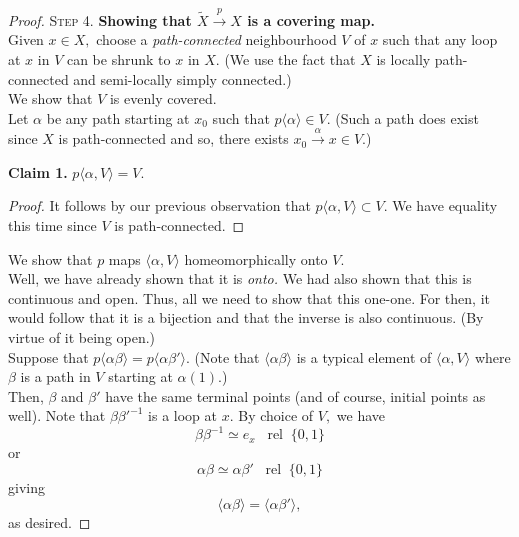 \documentclass[12pt]{article}
\theoremstyle{definition}
\numberwithin{thm}{section}
\newcommand{\rel}{\;\;\operatorname{rel}\;}
\newenvironment{blockquote}
{\begin{mdframed}[skipabove=0pt, skipbelow=0pt, innertopmargin=4pt, innerbottommargin=4pt, bottomline=false,topline=false,rightline=false, linewidth=2pt]}
{\end{mdframed}}
\begin{document}
\begin{proof}
\textsc{Step 4.} \textbf{Showing that $\tilde{X} \overset{p}{\longrightarrow} X$ is a covering map.}\\
Given $x \in X,$ choose a \emph{path-connected} neighbourhood $V$ of $x$ such that any loop at $x$ in $V$ can be shrunk to $x$ in $X.$ (We use the fact that $X$ is locally path-connected and semi-locally simply connected.) \\
We show that $V$ is evenly covered. \\
Let $\alpha$ be any path starting at $x_0$ such that $p\langle \alpha\rangle \in V.$ (Such a path does exist since $X$ is path-connected and so, there exists $x_0\overset{\alpha}{\longrightarrow} x \in V.$) \\
\begin{blockquote}
	\textbf{Claim 1.} $p\langle \alpha, V\rangle = V.$
	\begin{proof} 
		It follows by our previous observation that $p\langle \alpha, V\rangle \subset V.$ We have equality this time since $V$ is path-connected.
	\end{proof}
\end{blockquote}
We show that $p$ maps $\langle \alpha, V\rangle$ homeomorphically onto $V.$\\
Well, we have already shown that it is \emph{onto.} We had also shown that this is continuous and open. Thus, all we need to show that this one-one. For then, it would follow that it is a bijection and that the inverse is also continuous. (By virtue of it being open.)\\
Suppose that $p\langle \alpha\beta\rangle = p\langle \alpha\beta'\rangle.$ (Note that $\langle \alpha\beta\rangle$ is a typical element of $\langle \alpha, V\rangle$ where $\beta$ is a path in $V$ starting at $\alpha(1)$.)\\
Then, $\beta$ and $\beta'$ have the same terminal points (and of course, initial points as well). Note that $\beta\beta'^{-1}$ is a loop at $x.$ By choice of $V,$ we have
\begin{equation*} 
	\beta\beta^{-1} \simeq e_x \rel\{0, 1\}
\end{equation*}
or
\begin{equation*} 
	\alpha\beta \simeq \alpha\beta' \rel\{0, 1\}
\end{equation*}
giving
\begin{equation*} 
	\langle \alpha\beta\rangle = \langle \alpha\beta'\rangle,
\end{equation*}
as desired.


\end{proof}
\end{document}
